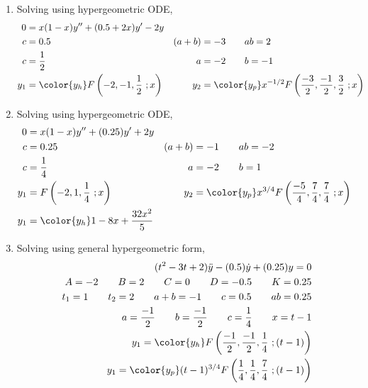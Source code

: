 \begin{enumerate}
    \item Solving using hypergeometric ODE,
          \begin{align}
              0     & = x(1-x)y'' + (0.5 + 2x)y' - 2y                       \\
              c     & = 0.5                                               &
              (a+b) & = -3 \qquad ab = 2                                    \\
              c     & = \frac{1}{2}                                       &
              a     & = -2 \qquad b = -1                                    \\
              y_1   & = \color{y_h} F\left( -2,-1,\frac{1}{2}\ ;x \right) &
              y_2   & = \color{y_p} x^{-1/2}F \left(
              \frac{-3}{2}, \frac{-1}{2}, \frac{3}{2}\ ;x \right)
          \end{align}

    \item Solving using hypergeometric ODE,
          \begin{align}
              0     & = x(1-x)y'' + (0.25)y' + 2y                \\
              c     & = 0.25                                 &
              (a+b) & = -1 \qquad ab = -2                        \\
              c     & = \frac{1}{4}                          &
              a     & = -2 \qquad b = 1                          \\
              y_1   & = F\left( -2,1,\frac{1}{4}\ ;x \right) &
              y_2   & = \color{y_p} x^{3/4}F \left(
              \frac{-5}{4}, \frac{7}{4}, \frac{7}{4}\ ;x \right) \\
              y_1   & = \color{y_h} 1 - 8x + \frac{32x^2}{5}
          \end{align}

    \item Solving using general hypergeometric form,
          \begin{align}
              (t^2 - 3t + 2)\ddot{y} - (0.5) \dot{y} + (0.25)y = 0                   \\
              A = -2 \qquad B = 2 \qquad C = 0 \qquad D = -0.5 \qquad K  = 0.25      \\
              t_1 = 1 \qquad t_2 = 2 \qquad a+b = -1 \qquad c = 0.5 \qquad ab = 0.25 \\
              a = \frac{-1}{2} \qquad b = \frac{-1}{2} \qquad c = \frac{1}{4}
              \qquad x = t-1                                                         \\
              y_1 = \color{y_h} F\left( \frac{-1}{2}, \frac{-1}{2}, \frac{1}{4}
              \ ;(t-1) \right)                                                       \\
              y_1 = \color{y_p} (t-1)^{3/4} F\left( \frac{1}{4}, \frac{1}{4}, \frac{7}{4}
              \ ;(t-1) \right)
          \end{align}


\end{enumerate}
